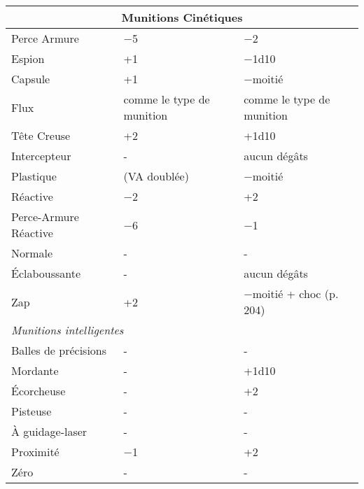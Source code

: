 \begin{table} \begin{tabular}{|l|l|l|} \hline

\multicolumn{3}{|c|}{\textbf{Munitions Cinétiques}} \\ \hline

Perce Armure	&$-$5	&$-$2 \\ \hline

Espion	&+1	&$-$1d10 \\ \hline

Capsule	&+1	&$-$moitié \\ \hline

Flux	&comme le type de munition	&comme le type de munition \\ \hline

Tête Creuse	&+2	&+1d10 \\ \hline

Intercepteur	&- &aucun dégâts \\ \hline

Plastique	&(VA doublée)	&$-$moitié \\ \hline

Réactive	&$-$2	&+2 \\ \hline

Perce-Armure Réactive	&$-$6	&$-$1 \\ \hline

Normale	&- &- \\ \hline

Éclaboussante	&- &aucun dégâts \\ \hline

Zap	&+2	&$-$moitié + choc (p. 204) \\ \hline

\multicolumn{3}{|l|}{\emph{Munitions intelligentes}} \\ \hline

Balles de précisions	&- &- \\ \hline

Mordante	&- &+1d10 \\ \hline

Écorcheuse	&- &+2 \\ \hline

Pisteuse	&- &- \\ \hline

À guidage-laser	&- &- \\ \hline

Proximité	&$-$1	&+2 \\ \hline

Zéro	&- &- \\ \hline

\end{tabular} \label{tab:kinetic-ammo} \end{table} 

